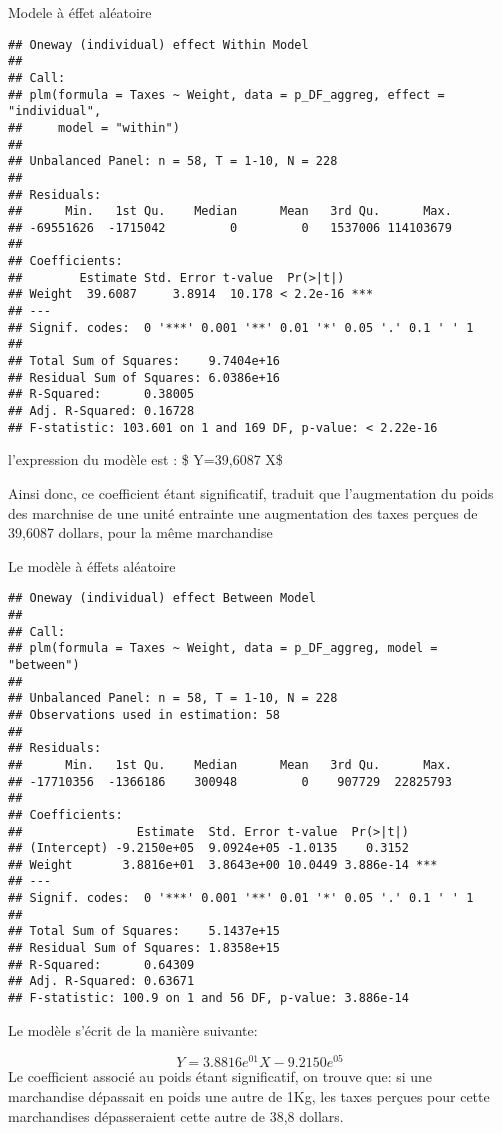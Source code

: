 \documentclass[
]{book}
\begin{document}
Modele à éffet aléatoire

\begin{verbatim}
## Oneway (individual) effect Within Model
## 
## Call:
## plm(formula = Taxes ~ Weight, data = p_DF_aggreg, effect = "individual", 
##     model = "within")
## 
## Unbalanced Panel: n = 58, T = 1-10, N = 228
## 
## Residuals:
##      Min.   1st Qu.    Median      Mean   3rd Qu.      Max. 
## -69551626  -1715042         0         0   1537006 114103679 
## 
## Coefficients:
##        Estimate Std. Error t-value  Pr(>|t|)    
## Weight  39.6087     3.8914  10.178 < 2.2e-16 ***
## ---
## Signif. codes:  0 '***' 0.001 '**' 0.01 '*' 0.05 '.' 0.1 ' ' 1
## 
## Total Sum of Squares:    9.7404e+16
## Residual Sum of Squares: 6.0386e+16
## R-Squared:      0.38005
## Adj. R-Squared: 0.16728
## F-statistic: 103.601 on 1 and 169 DF, p-value: < 2.22e-16
\end{verbatim}

l'expression du modèle est : \$ Y=39,6087 X\$

Ainsi donc, ce coefficient étant significatif, traduit que l'augmentation du poids des marchnise de une unité entrainte une augmentation des taxes perçues de 39,6087 dollars, pour la même marchandise

Le modèle à éffets aléatoire

\begin{verbatim}
## Oneway (individual) effect Between Model
## 
## Call:
## plm(formula = Taxes ~ Weight, data = p_DF_aggreg, model = "between")
## 
## Unbalanced Panel: n = 58, T = 1-10, N = 228
## Observations used in estimation: 58
## 
## Residuals:
##      Min.   1st Qu.    Median      Mean   3rd Qu.      Max. 
## -17710356  -1366186    300948         0    907729  22825793 
## 
## Coefficients:
##                Estimate  Std. Error t-value  Pr(>|t|)    
## (Intercept) -9.2150e+05  9.0924e+05 -1.0135    0.3152    
## Weight       3.8816e+01  3.8643e+00 10.0449 3.886e-14 ***
## ---
## Signif. codes:  0 '***' 0.001 '**' 0.01 '*' 0.05 '.' 0.1 ' ' 1
## 
## Total Sum of Squares:    5.1437e+15
## Residual Sum of Squares: 1.8358e+15
## R-Squared:      0.64309
## Adj. R-Squared: 0.63671
## F-statistic: 100.9 on 1 and 56 DF, p-value: 3.886e-14
\end{verbatim}

Le modèle s'écrit de la manière suivante:

\[Y= 3.8816e^{01}X -9.2150e^{05}\]
Le coefficient associé au poids étant significatif, on trouve que: si une marchandise dépassait en poids une autre de 1Kg, les taxes perçues pour cette marchandises dépasseraient cette autre de 38,8 dollars.
\end{document}

